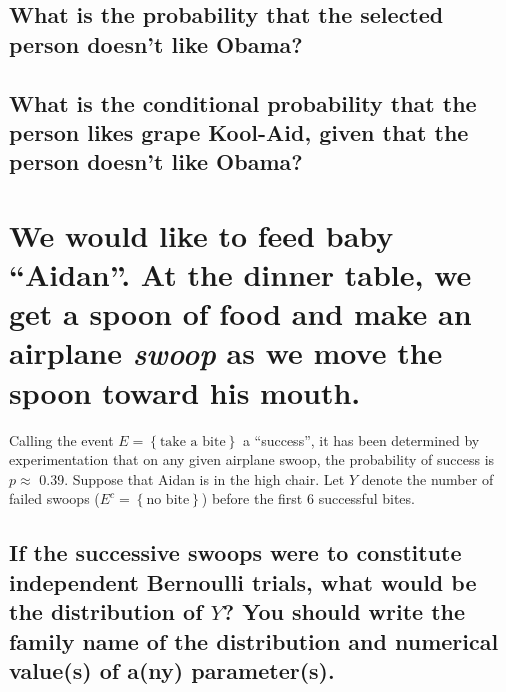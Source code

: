 \documentclass[11pt]{article}
\begin{document}
\subsection[What is the probability that the selected person doesn't like Obama?]{What is the probability that the selected person doesn't like Obama?}
\label{sec-1-2}
\subsubsection[]{}
\label{sec-1-2-1}
\vspace{0.5in}
\subsection[What is the conditional probability that the person likes grape Kool-Aid, given that the person doesn't like Obama?]{What is the conditional probability that the person likes grape Kool-Aid, given that the person doesn't like Obama?}
\label{sec-1-3}
\subsubsection[]{}
\label{sec-1-3-1}
\vspace{1in}
\section[We would like to feed baby ``Aidan''. At the dinner table, we get a spoon of food and make an airplane \emph{swoop} as we move the spoon toward his mouth.]{We would like to feed baby ``Aidan''. At the dinner table, we get a spoon of food and make an airplane \emph{swoop} as we move the spoon toward his mouth.}
\label{sec-2}

Calling the event \( E = \left\{ \mbox{take a bite}\right\} \) a
``success'', it has been determined by experimentation that on any
given airplane swoop, the probability of success is \(p \approx\)
0.39. Suppose that Aidan is in the high chair. Let \(Y\) denote the
number of failed swoops (\(E^{c}=\left\{ \mbox{no bite}\right\}\))
before the first 6 successful bites.

\subsection[If the successive swoops were to constitute independent Bernoulli trials, what would be the distribution of \(Y\)? You should write the family name of the distribution and numerical value(s) of a(ny) parameter(s).]{If the successive swoops were to constitute independent Bernoulli trials, what would be the distribution of \(Y\)? You should write the family name of the distribution and numerical value(s) of a(ny) parameter(s).}
\label{sec-2-1}
\end{document}
